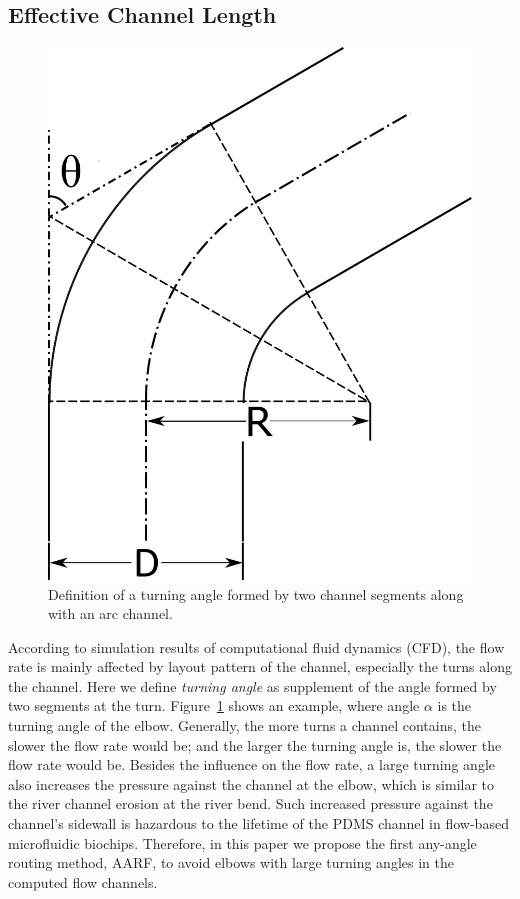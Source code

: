 \documentclass[journal]{IEEEtran}
\begin{document}
\subsection{Effective Channel Length}
\label{subsec:pre}

\begin{figure}
\label{fig:overview}
\centering
\includegraphics[width=0.6\columnwidth, angle=0]{./Figs/turnangleDef.pdf}
\vspace{-0.2cm}
\caption{Definition of a turning angle formed by two channel segments along with an arc channel.}
\label{fig:turnangle}
\end{figure}

According to simulation results of computational fluid dynamics (CFD), the flow rate is 
mainly affected by layout pattern of the channel, especially the turns along the channel. 
Here we define {\em turning angle} as supplement of the angle formed by two segments at
the turn.
Figure~\ref{fig:turnangle} shows an example, where angle $\alpha$ is the turning angle of 
the elbow.
Generally, the more turns a channel contains, the slower the flow rate would be; 
and the larger the turning angle is, the slower the flow rate would be.
Besides the influence on the flow rate, a large turning angle also increases 
the pressure against the channel at the elbow, which is similar to the river 
channel erosion at the river bend. Such increased pressure against the channel's 
sidewall is hazardous to the lifetime of the PDMS channel in flow-based microfluidic 
biochips. Therefore, in this paper we propose the first any-angle routing method, AARF, to 
avoid elbows with large turning angles in the computed flow channels.
\end{document}

